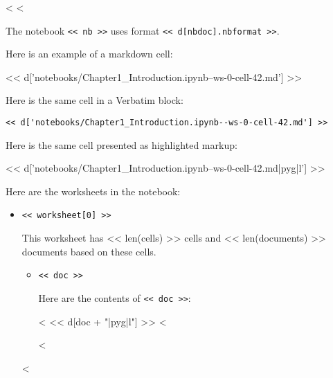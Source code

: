 \documentclass[12pt]{article}
\begin{document}
<%
<%

The notebook \verb|<< nb >>| uses format \verb|<< d[nbdoc].nbformat >>|.

Here is an example of a markdown cell:

<< d['notebooks/Chapter1_Introduction.ipynb--ws-0-cell-42.md'] >>

Here is the same cell in a Verbatim block:

\begin{Verbatim}
<< d['notebooks/Chapter1_Introduction.ipynb--ws-0-cell-42.md'] >>
\end{Verbatim}

Here is the same cell presented as highlighted markup:

<< d['notebooks/Chapter1_Introduction.ipynb--ws-0-cell-42.md|pyg|l'] >>

Here are the worksheets in the notebook:

\begin{itemize}
<%
<%
<%

\item{\verb|<< worksheet[0] >>|}

This worksheet has << len(cells) >> cells and << len(documents) >> documents based on these cells.

\begin{itemize}
<%
\item{\verb|<< doc >>|}

Here are the contents of \verb|<< doc >>|:

<%
<< d[doc + "|pyg|l"] >>
<%

<%
\end{itemize}

<%
\end{itemize}
\end{document}
